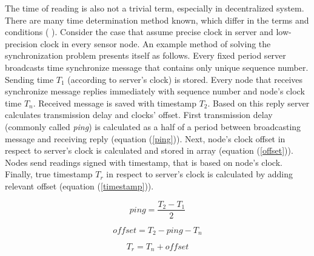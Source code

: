 The time of reading is also not a trivial term, especially in decentralized system. There are many time determination method known, which differ in the terms and conditions (\cite{time_sync} \cite{time_sync2}). Consider the case that assume precise clock in server and low-precision clock in every sensor node. An example method of solving the synchronization problem presents itself as follows. Every fixed period server broadcasts time synchronize message that contains only unique sequence number. Sending time $T_1$ (according to server's clock) is stored. Every node that receives synchronize message replies immediately with sequence number and node's clock time $T_n$. Received message is saved with timestamp $T_2$. Based on this reply server calculates transmission delay and clocks' offset. First transmission delay (commonly called \textit{ping}) is calculated as a half of a period between broadcasting message and receiving reply (equation (\ref{ping})). Next, node's clock offset in respect to server's clock is calculated and stored in array (equation (\ref{offset})). Nodes send readings signed with timestamp, that is based on node's clock. Finally, true timestamp $T_r$ in respect to server's clock is calculated by adding relevant offset (equation (\ref{timestamp})).

\begin{equation}
	ping = \frac{T_2 - T_1}{2}
	\label{ping}
\end{equation}

\begin{equation}
	offset = T_2 - ping - T_n
	\label{offset}
\end{equation}

\begin{equation}
	T_r = T_n + offset
	\label{timestamp}
\end{equation}